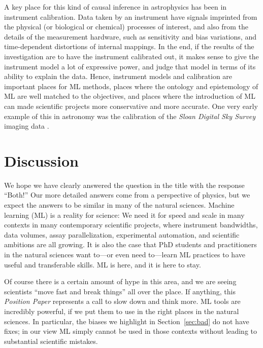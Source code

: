 \documentclass{article}
\newcommand{\documentname}{\textsl{Position Paper}}
\newcommand{\sectionname}{Section}
\newcommand{\secref}[1]{\sectionname~\ref{#1}}
\begin{document}
A key place for this kind of causal inference in astrophysics has been in instrument calibration.
Data taken by an instrument have signals imprinted from the physical (or biological or chemical) processes of interest, and also from the details of the measurement hardware, such as sensitivity and bias variations, and time-dependent distortions of internal mappings.
In the end, if the results of the investigation are to have the instrument calibrated out, it makes sense to give the instrument model a lot of expressive power, and judge that model in terms of its ability to explain the data.
Hence, instrument models and calibration are important places for ML methods, places where the ontology and epistemology of ML are well matched to the objectives, and places where the introduction of ML can made scientific projects more conservative and more accurate.
One very early example of this in astronomy was the calibration of the \textsl{Sloan Digital Sky Survey} imaging data \cite{ubercalibration}.

\section{Discussion}\label{sec:discussion}

We hope we have clearly answered the question in the title with the response ``Both!''
Our more detailed answers come from a perspective of physics, but we expect the answers to be similar in many of the natural sciences.
Machine learning (ML) is a reality for science:
We need it for speed and scale in many contexts in many contemporary scientific projects, where instrument bandwidths, data volumes, assay parallelization, experimental automation, and scientific ambitions are all growing.
It is also the case that PhD students and practitioners in the natural sciences want to---or even need to---learn ML practices to have useful and transferable skills.
ML is here, and it is here to stay.

Of course there is a certain amount of hype in this area, and we are seeing scientists ``move fast and break things'' all over the place.
If anything, this \documentname{} represents a call to slow down and think more.
ML tools are incredibly powerful, if we put them to use in the right places in the natural sciences.
In particular, the biases we highlight in \secref{sec:bad} do not have fixes; in our view ML simply cannot be used in those contexts without leading to substantial scientific mistakes.
\end{document}
